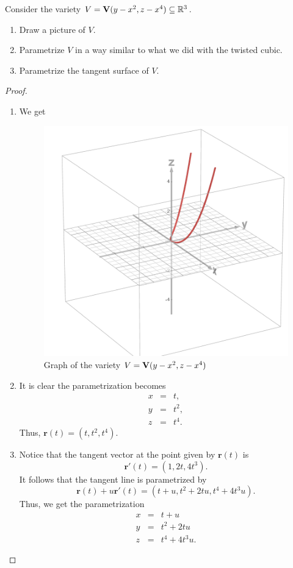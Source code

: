 \begin{exercise}{12}
Consider the variety $V = \mathbf{V}(y-x^2,z-x^4)\subseteq\mathbb{R}^3$.
\begin{enumerate}
    \item Draw a picture of $V$.
    \item Parametrize $V$ in a way similar to what we did with the twisted cubic.
    \item Parametrize the tangent surface of $V$.
\end{enumerate}
\end{exercise}
\begin{proof}
    \begin{enumerate}
        \item We get
        \begin{figure}[H]
            \centering
            \includegraphics[width=0.5\linewidth]{cox-little-oshea/assets/sec1-3-ex12.png}
            \caption{Graph of the variety $V = \mathbf{V}(y-x^2,z-x^4)$}
            \label{fig:sec1-3-ex12}
        \end{figure}
        \item It is clear the parametrization becomes
        \begin{eqnarray*}
            x & = & t,\\
            y & = & t^2,\\
            z & = & t^4.
        \end{eqnarray*}
        Thus, $\mathbf{r}(t)= (t, t^2, t^4)$.
        \item Notice that the tangent vector at the point given by $\mathbf{r}(t)$ is 
        $$\mathbf{r}'(t) = (1, 2t, 4t^3).$$
        It follows that the tangent line is parametrized by
        $$\mathbf{r}(t) + u\mathbf{r}'(t) = (t + u, t^2 + 2tu, t^4 + 4t^3 u).$$
        Thus, we get the parametrization
        \begin{eqnarray*}
            x & = & t+u\\
            y & = & t^2 + 2tu\\
            z & = & t^4 + 4t^3 u.
        \end{eqnarray*}
    \end{enumerate}
\end{proof}

